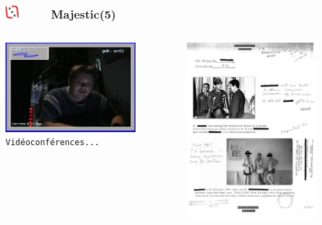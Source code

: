 \documentclass[slidetop,11pt]{beamer}
\def\sectionPartIIaV{Majestic}
\def\moreInFrameTitleLeftt{\includegraphics[height=0.5cm]{img/ligueludique-0.png}~~~~~}
\begin{document}
\begin{frame}
	\frametitle{\moreInFrameTitleLeftt \sectionPartIIaV (5) }
	\begin{columns}[T]
		\begin{column}[T]{5.05cm}
			\includegraphics[width=5.00cm]{img/majesticARGgame/tu-fais-ch-joe-tu-sais-quelle-heure-il-est-ici-ME0000034570_2.jpg}~\\
			\texttt{\footnotesize Vid{\'e}oconf{\'e}rences... }
		\end{column}
		\begin{column}[T]{5.05cm}
			\includegraphics[width=5.00cm]{img/majesticARGgame/youve-got-fax-ME0000034568_2.jpg}~\\
		\end{column}
	\end{columns}
\end{frame}
\end{document}
